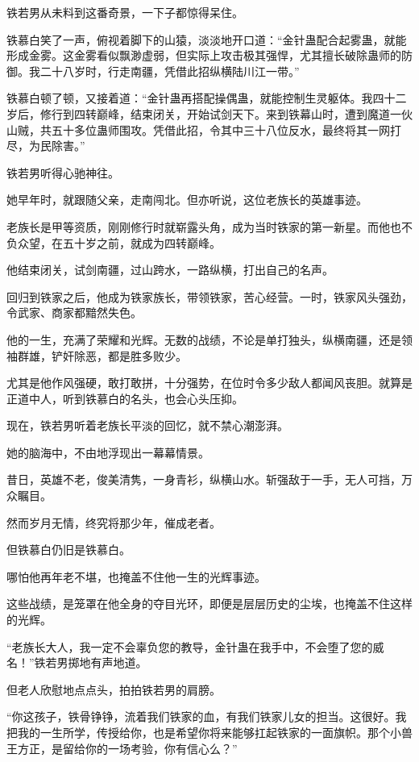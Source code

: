 \begin{this_body}
铁若男从未料到这番奇景，一下子都惊得呆住。

铁慕白笑了一声，俯视着脚下的山猿，淡淡地开口道：“金针蛊配合起雾蛊，就能形成金雾。这金雾看似飘渺虚弱，但实际上攻击极其强悍，尤其擅长破除蛊师的防御。我二十八岁时，行走南疆，凭借此招纵横陆川江一带。”

铁慕白顿了顿，又接着道：“金针蛊再搭配操偶蛊，就能控制生灵躯体。我四十二岁后，修行到四转巅峰，结束闭关，开始试剑天下。来到铁幕山时，遭到魔道一伙山贼，共五十多位蛊师围攻。凭借此招，令其中三十八位反水，最终将其一网打尽，为民除害。”

铁若男听得心驰神往。

她早年时，就跟随父亲，走南闯北。但亦听说，这位老族长的英雄事迹。

老族长是甲等资质，刚刚修行时就崭露头角，成为当时铁家的第一新星。而他也不负众望，在五十岁之前，就成为四转巅峰。

他结束闭关，试剑南疆，过山跨水，一路纵横，打出自己的名声。

回归到铁家之后，他成为铁家族长，带领铁家，苦心经营。一时，铁家风头强劲，令武家、商家都黯然失色。

他的一生，充满了荣耀和光辉。无数的战绩，不论是单打独头，纵横南疆，还是领袖群雄，铲奸除恶，都是胜多败少。

尤其是他作风强硬，敢打敢拼，十分强势，在位时令多少敌人都闻风丧胆。就算是正道中人，听到铁慕白的名头，也会心头压抑。

现在，铁若男听着老族长平淡的回忆，就不禁心潮澎湃。

她的脑海中，不由地浮现出一幕幕情景。

昔日，英雄不老，俊美清隽，一身青衫，纵横山水。斩强敌于一手，无人可挡，万众瞩目。

然而岁月无情，终究将那少年，催成老者。

但铁慕白仍旧是铁慕白。

哪怕他再年老不堪，也掩盖不住他一生的光辉事迹。

这些战绩，是笼罩在他全身的夺目光环，即便是层层历史的尘埃，也掩盖不住这样的光辉。

“老族长大人，我一定不会辜负您的教导，金针蛊在我手中，不会堕了您的威名！”铁若男掷地有声地道。

但老人欣慰地点点头，拍拍铁若男的肩膀。

“你这孩子，铁骨铮铮，流着我们铁家的血，有我们铁家儿女的担当。这很好。我把我的一生所学，传授给你，也是希望你将来能够扛起铁家的一面旗帜。那个小兽王方正，是留给你的一场考验，你有信心么？”


\end{this_body}
